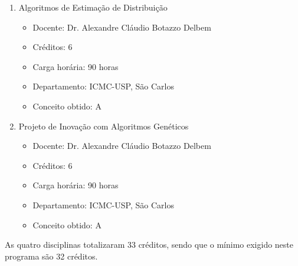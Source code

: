 \begin{enumerate}
	\item Algoritmos de Estimação de Distribuição
	\begin{itemize}
		\item Docente: Dr. Alexandre Cláudio Botazzo Delbem
		\item Créditos: 6
		\item Carga horária: 90 horas
		\item Departamento: ICMC-USP, São Carlos
		\item Conceito obtido: A
	\end{itemize}
	\item Projeto de Inovação com Algoritmos Genéticos
	\begin{itemize}
		\item Docente: Dr. Alexandre Cláudio Botazzo Delbem
		\item Créditos: 6
		\item Carga horária: 90 horas
		\item Departamento: ICMC-USP, São Carlos
		\item Conceito obtido: A
	\end{itemize}
\end{enumerate}

As quatro disciplinas totalizaram 33 créditos, sendo que o mínimo exigido neste programa são 32 créditos.
